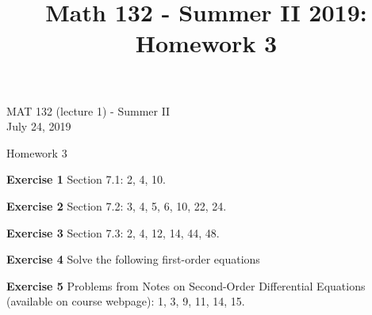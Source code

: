 \documentclass[12pt,oneside]{exam}
\title{Math 132 - Summer II 2019: Homework 3}
\newenvironment{exercise}[1]{\vspace{.1in}\noindent\textbf{Exercise #1 \hspace{.05em}}}{}
\begin{document}
\begin{flushright}
\sc MAT 132 (lecture 1) - Summer II\\
July 24, 2019
\end{flushright}
\bigskip

\begin{center}
\textsf{Homework 3} 
\end{center}


\begin{exercise}{1}
Section 7.1: 2, 4, 10.
\end{exercise}

\begin{exercise}{2}
Section 7.2: 3, 4, 5, 6, 10, 22, 24.
\end{exercise}

\begin{exercise}{3} 
Section 7.3: 2, 4, 12, 14, 44, 48.
\end{exercise}

\begin{exercise}{4}
Solve the following first-order equations
\end{exercise}

\begin{exercise}{5}
Problems from Notes on Second-Order Differential Equations (available on course webpage): 1, 3, 9, 11, 14, 15.
\end{exercise}
\end{document}
